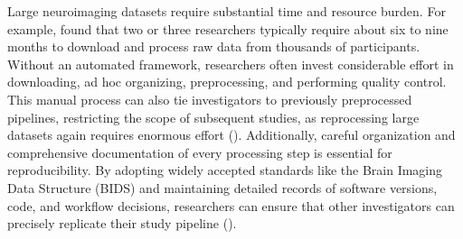 Large neuroimaging datasets require substantial time and resource burden. 
For example, \cite{horien2021hitchhiker} found that two or three researchers typically 
require about six to nine months to download and process raw data from thousands of participants. 
Without an automated framework, researchers often invest considerable effort in downloading, 
ad hoc organizing, preprocessing, and performing quality control. 
This manual process can also tie investigators to previously preprocessed pipelines, 
restricting the scope of subsequent studies, as reprocessing large datasets again 
requires enormous effort (\cite{horien2021hitchhiker}). 
Additionally, careful organization and comprehensive documentation of every processing step is essential for reproducibility. 
By adopting widely accepted standards like the Brain Imaging Data Structure (BIDS) and 
maintaining detailed records of software versions, code, and workflow decisions, 
researchers can ensure that other investigators can precisely replicate their study pipeline (\cite{white2022data, horien2021hitchhiker}). 


